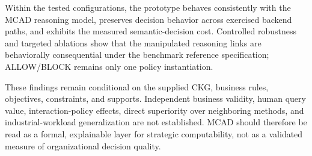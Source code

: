 \documentclass[journal]{IEEEtran}
\begin{document}
Within the tested configurations, the prototype behaves consistently with the MCAD reasoning model, preserves decision behavior across exercised backend paths, and exhibits the measured semantic-decision cost. Controlled robustness and targeted ablations show that the manipulated reasoning links are behaviorally consequential under the benchmark reference specification; ALLOW/BLOCK remains only one policy instantiation.

These findings remain conditional on the supplied CKG, business rules, objectives, constraints, and supports. Independent business validity, human query value, interaction-policy effects, direct superiority over neighboring methods, and industrial-workload generalization are not established. MCAD should therefore be read as a formal, explainable layer for strategic computability, not as a validated measure of organizational decision quality.

\endgroup

\FloatBarrier
\appendices


\FloatBarrier
\balance


\end{document}
